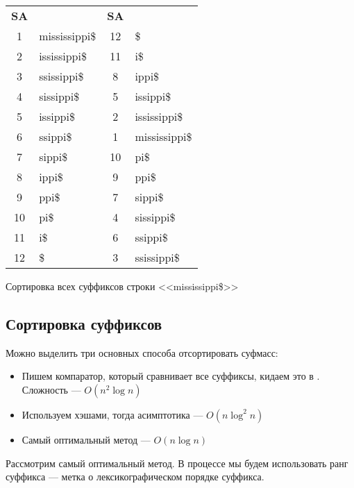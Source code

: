 \documentclass[a4paper]{article}
\begin{document}
\begin{center}
    \begin{tabular}{c l c l }
        \textbf{SA} & \textbf{} & \textbf{SA} & \textbf{} \\
        1  & mississippi\$  & 12 & \$ \\
        2  & ississippi\$   & 11 & i\$ \\
        3  & ssissippi\$    & 8  & ippi\$ \\
        4  & sissippi\$     & 5  & issippi\$ \\
        5  & issippi\$      & 2  & ississippi\$ \\
        6  & ssippi\$       & 1  & mississippi\$ \\
        7  & sippi\$        & 10 & pi\$ \\
        8  & ippi\$         & 9  & ppi\$ \\
        9  & ppi\$          & 7  & sippi\$ \\
        10 & pi\$           & 4  & sissippi\$ \\
        11 & i\$            & 6  & ssippi\$ \\
        12 & \$             & 3  & ssissippi\$ \\
    \end{tabular}

    Сортировка всех суффиксов строки <<mississippi\$>>
\end{center}

\subsection{Сортировка суффиксов}
Можно выделить три основных способа отсортировать суфмасс:
\begin{itemize}
    \item Пишем компаратор, который сравнивает все суффиксы, кидаем это в . Сложность —  $O(n^2\log n)$
    \item Используем хэшами, тогда асимптотика — $O(n\log^2 n)$
    \item Самый оптимальный метод — $O(n\log n)$
\end{itemize}

Рассмотрим самый оптимальный метод. В процессе мы будем использовать ранг суффикса — метка о лексикографическом порядке суффикса.
\end{document}
